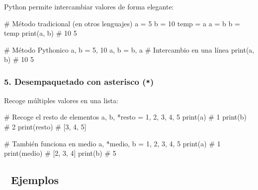\documentclass[
  doc,
  floatsintext,
  longtable,
  a4paper,
  nolmodern,
  notxfonts,
  notimes,
  12pt,
  colorlinks=true,linkcolor=blue,citecolor=blue,urlcolor=blue]{apa7}
\newenvironment{Shaded}{\begin{snugshade}}{\end{snugshade}}
\newcommand{\BuiltInTok}[1]{\textcolor[rgb]{0.00,0.23,0.31}{#1}}
\newcommand{\CommentTok}[1]{\textcolor[rgb]{0.37,0.37,0.37}{#1}}
\newcommand{\DecValTok}[1]{\textcolor[rgb]{0.68,0.00,0.00}{#1}}
\newcommand{\NormalTok}[1]{\textcolor[rgb]{0.00,0.23,0.31}{#1}}
\newcommand{\OperatorTok}[1]{\textcolor[rgb]{0.37,0.37,0.37}{#1}}
\begin{document}
Python permite intercambiar valores de forma elegante:

\begin{Shaded}
\begin{Highlighting}[]
\CommentTok{\# Método tradicional (en otros lenguajes)}
\NormalTok{a }\OperatorTok{=} \DecValTok{5}
\NormalTok{b }\OperatorTok{=} \DecValTok{10}
\NormalTok{temp }\OperatorTok{=}\NormalTok{ a}
\NormalTok{a }\OperatorTok{=}\NormalTok{ b}
\NormalTok{b }\OperatorTok{=}\NormalTok{ temp}
\BuiltInTok{print}\NormalTok{(a, b)  }\CommentTok{\# 10 5}

\CommentTok{\# Método Pythonico}
\NormalTok{a, b }\OperatorTok{=} \DecValTok{5}\NormalTok{, }\DecValTok{10}
\NormalTok{a, b }\OperatorTok{=}\NormalTok{ b, a  }\CommentTok{\# Intercambio en una línea}
\BuiltInTok{print}\NormalTok{(a, b)  }\CommentTok{\# 10 5}
\end{Highlighting}
\end{Shaded}

\subsubsection{\texorpdfstring{5. Desempaquetado con asterisco
(\texttt{*})}{5. Desempaquetado con asterisco (*)}}\label{desempaquetado-con-asterisco}

Recoge múltiples valores en una lista:

\begin{Shaded}
\begin{Highlighting}[]
\CommentTok{\# Recoge el resto de elementos}
\NormalTok{a, b, }\OperatorTok{*}\NormalTok{resto }\OperatorTok{=} \DecValTok{1}\NormalTok{, }\DecValTok{2}\NormalTok{, }\DecValTok{3}\NormalTok{, }\DecValTok{4}\NormalTok{, }\DecValTok{5}
\BuiltInTok{print}\NormalTok{(a)      }\CommentTok{\# 1}
\BuiltInTok{print}\NormalTok{(b)      }\CommentTok{\# 2}
\BuiltInTok{print}\NormalTok{(resto)  }\CommentTok{\# [3, 4, 5]}

\CommentTok{\# También funciona en medio}
\NormalTok{a, }\OperatorTok{*}\NormalTok{medio, b }\OperatorTok{=} \DecValTok{1}\NormalTok{, }\DecValTok{2}\NormalTok{, }\DecValTok{3}\NormalTok{, }\DecValTok{4}\NormalTok{, }\DecValTok{5}
\BuiltInTok{print}\NormalTok{(a)      }\CommentTok{\# 1}
\BuiltInTok{print}\NormalTok{(medio)  }\CommentTok{\# [2, 3, 4]}
\BuiltInTok{print}\NormalTok{(b)      }\CommentTok{\# 5}
\end{Highlighting}
\end{Shaded}

\subsection{🔬 Ejemplos}\label{ejemplos}
\end{document}
